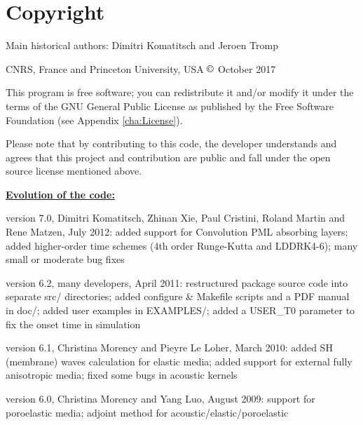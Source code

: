 
\chapter*{Copyright}

Main historical authors: Dimitri Komatitsch and Jeroen Tromp

CNRS, France and Princeton University, USA\newline
$\copyright$ October 2017\newline

\noindent
This program is free software; you can redistribute it and/or modify
it under the terms of the GNU General Public License as published
by the Free Software Foundation (see Appendix \ref{cha:License}).\newline

\noindent
Please note that by contributing to this code, the developer understands and agrees that this project and contribution
are public and fall under the open source license mentioned above.\newline

\noindent
\textbf{\underline{Evolution of the code:}}\newline

version 7.0, Dimitri Komatitsch, Zhinan Xie, Paul Cristini, Roland Martin and Rene Matzen, July 2012:\newline
added support for Convolution PML absorbing layers;
added higher-order time schemes (4th order Runge-Kutta and LDDRK4-6);
many small or moderate bug fixes\newline

version 6.2, many developers, April 2011:\newline
restructured package source code into separate src/ directories;
added configure \& Makefile scripts and a PDF manual in doc/;
added user examples in EXAMPLES/;
added a USER\_T0 parameter to fix the onset time in simulation\newline

version 6.1, Christina Morency and Pieyre Le Loher, March 2010:\newline
added SH (membrane) waves calculation for elastic media;
added support for external fully anisotropic media;
fixed some bugs in acoustic kernels\newline

version 6.0, Christina Morency and Yang Luo, August 2009:\newline
support for poroelastic media;
adjoint method for acoustic/elastic/poroelastic\newline

